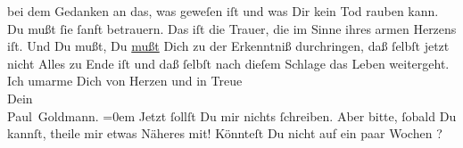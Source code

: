 \begin{ledgroupsized}[t]{13cm}
               bei dem Gedanken an das, was geweſen iſt und was Dir kein Tod rauben kann. {\pb}Du mußt ſie ſanft betrauern. Das iſt die Trauer, die im Sinne ihres
               armen Herzens iſt. Und Du mußt, Du \uline{mußt} Dich zu der
               Erkenntniß durchringen, daß ſelbſt jetzt nicht Alles zu Ende iſt und daß ſelbſt nach
               dieſem Schlage das Leben weitergeht.\pend
           \pstart
           Ich umarme Dich von Herzen und in Treue {\\[\baselineskip]}Dein {\\[\baselineskip]}\spacefill\mbox{Paul Goldmann.}\pend
           \leftskip=0em{}\pstart
           \noindent{}Jetzt ſollſt Du mir nichts ſchreiben. Aber bitte, ſobald Du kannſt, theile mir
                  etwas Näheres mit!\pend
           \pstart
           Könnteſt Du nicht auf ein paar Wochen \label{K_L02870-3v}\label{K_L02870-3h}?\pend
           
         
         \endnumbering{}\end{ledgroupsized}  \newcommand{\dateiname}{L02870}\newcommand{\titel}{Paul Goldmann an Arthur Schnitzler, 20. 3. [1899]}\newcommand{\editorInnen}{Martin Anton Müller und Laura Untner}
      